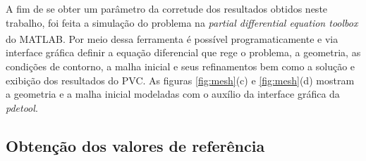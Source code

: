 \documentclass[
    12pt,               %
    openright,          %
    oneside,
    a4paper,            %
    english,            %
    french,             %
    spanish,            %
    brazil              %
    ]{abntex2}
\newcommand{\matlab}{MATLAB\textsuperscript{\textregistered}}
\begin{document}
A fim de se obter um parâmetro da corretude dos resultados obtidos neste trabalho, foi feita a simulação do problema na \textit{partial differential equation toolbox} do \matlab. Por meio dessa ferramenta é possível programaticamente e via interface gráfica definir a equação diferencial que rege o problema, a geometria, as condições de contorno, a malha inicial e seus refinamentos bem como a solução e exibição dos resultados do PVC. As figuras \ref{fig:mesh}{(c)} e \ref{fig:mesh}{(d)} mostram a geometria e a malha inicial modeladas com o auxílio da interface gráfica da \textit{pdetool}.

\subsection{Obtenção dos valores de referência}
\end{document}
